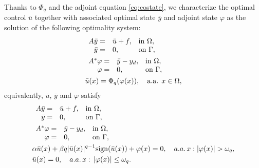 	Thanks to $\Phi_q$ and the adjoint equation \eqref{eq:costate}, we characterize the optimal control $\bar u$ together with associated optimal state $\bar y$ and adjoint state $\varphi$ as the solution of the following optimality system:
	\begin{subequations}\label{eq:system1}
		\begin{align} 
			&	\begin{array}{rll}
				A \bar y=& \bar u + f, &\hbox{in  } \Omega, \\
				\bar y=&0, &\hbox{on  }  \Gamma,
			\end{array} \\
			&\begin{array}{rll}
				A^*   \varphi=& \bar y -y_d, &\hbox{in  } \Omega, \\
				\varphi=&0, &\hbox{on  }  \Gamma, \label{eq:optimal_adjoint}
			\end{array}\\
			&\bar u (x) = \Phi_q (\varphi(x)), \quad  \text{a.a. } x \in \Omega, \label{eq:uPhi}
		\end{align} 	
	\end{subequations}
	equivalently, $\bar u$, $\bar y$ and $\varphi$ satisfy
	\begin{subequations}\label{eq:system2}
		\begin{align} 
			&	\begin{array}{rll}
				A \bar y=& \bar u + f, &\hbox{in  } \om, \\
				\bar y=&0, &\hbox{on  }  \Gamma,
			\end{array} \\
			&\begin{array}{rll}
				A^*   \varphi=& \bar y -y_d, &\hbox{in  } \om, \\
				\varphi=&0, &\hbox{on  }  \Gamma,
			\end{array}\\
			&\alpha \bar u (x) + \beta q |\bar u(x)|^{q-1} \sign(\bar u(x)) + \varphi(x)  = 0, \quad a.a. \, x: |\varphi(x)|>\omega_q, \label{eq:system2_gradeq} \\
			& \bar u(x) =0, \quad a.a. \, x: \,  |\varphi(x)| \le \omega_q. \label{eq:null_control}
		\end{align} 	
	\end{subequations}
	
